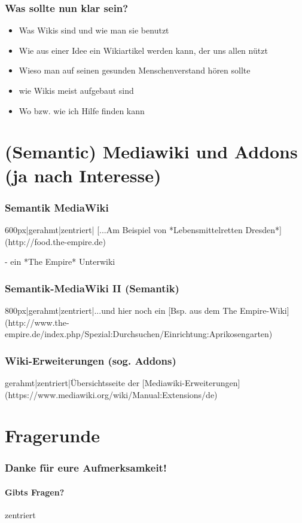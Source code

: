 \documentclass{beamer}              %
\begin{document}
  
\begin{frame}
  \frametitle{Was sollte nun klar sein?}
  \begin{itemize}[<+->]
    \item Was Wikis sind und wie man sie benutzt
    \item Wie aus einer Idee ein Wikiartikel werden kann, der uns allen nützt
    \item Wieso man auf seinen gesunden Menschenverstand hören sollte
    \item wie Wikis meist aufgebaut sind
    \item Wo bzw. wie ich Hilfe finden kann
  \end{itemize}
\end{frame}

\section{(Semantic) Mediawiki und Addons (ja nach Interesse)}

\begin{frame}
  \frametitle{Semantik MediaWiki}

  600px|gerahmt|zentriert| [...Am Beispiel von *Lebensmittelretten Dresden*](http://food.the-empire.de)

   - ein *The Empire* Unterwiki
\end{frame}
  
\begin{frame}
  \frametitle{Semantik-MediaWiki II (Semantik)}

  800px|gerahmt|zentriert|...und hier noch ein [Bsp. aus dem The Empire-Wiki](http://www.the-empire.de/index.php/Spezial:Durchsuchen/Einrichtung:Aprikosengarten)

\end{frame}


\begin{frame}
  \frametitle{Wiki-Erweiterungen (sog. Addons)}

  gerahmt|zentriert|Übersichtsseite der [Mediawiki-Erweiterungen](https://www.mediawiki.org/wiki/Manual:Extensions/de)

\end{frame}

\section{Fragerunde}

\begin{frame}
  \frametitle{Danke für eure Aufmerksamkeit!}
  \framesubtitle{Gibts Fragen?}

  zentriert

\end{frame}
\end{document}
